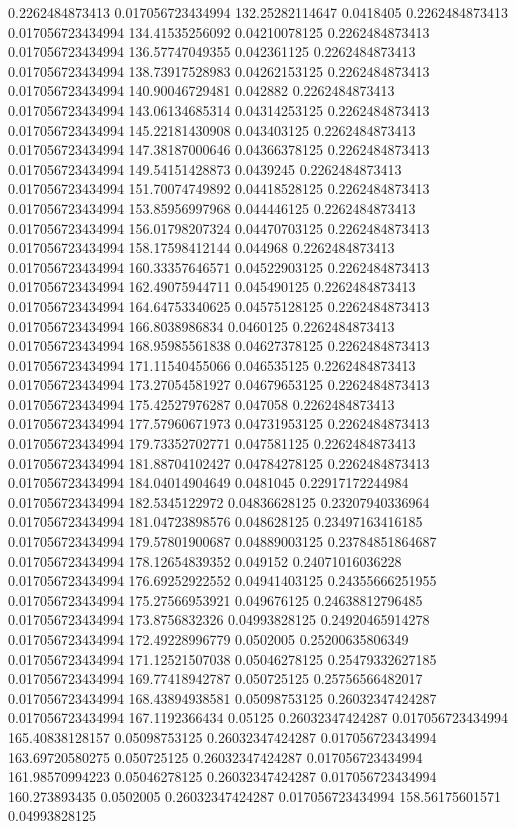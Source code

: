 0.2262484873413 0.017056723434994 132.25282114647 0.0418405
0.2262484873413 0.017056723434994 134.41535256092 0.04210078125
0.2262484873413 0.017056723434994 136.57747049355 0.042361125
0.2262484873413 0.017056723434994 138.73917528983 0.04262153125
0.2262484873413 0.017056723434994 140.90046729481 0.042882
0.2262484873413 0.017056723434994 143.06134685314 0.04314253125
0.2262484873413 0.017056723434994 145.22181430908 0.043403125
0.2262484873413 0.017056723434994 147.38187000646 0.04366378125
0.2262484873413 0.017056723434994 149.54151428873 0.0439245
0.2262484873413 0.017056723434994 151.70074749892 0.04418528125
0.2262484873413 0.017056723434994 153.85956997968 0.044446125
0.2262484873413 0.017056723434994 156.01798207324 0.04470703125
0.2262484873413 0.017056723434994 158.17598412144 0.044968
0.2262484873413 0.017056723434994 160.33357646571 0.04522903125
0.2262484873413 0.017056723434994 162.49075944711 0.045490125
0.2262484873413 0.017056723434994 164.64753340625 0.04575128125
0.2262484873413 0.017056723434994 166.8038986834 0.0460125
0.2262484873413 0.017056723434994 168.95985561838 0.04627378125
0.2262484873413 0.017056723434994 171.11540455066 0.046535125
0.2262484873413 0.017056723434994 173.27054581927 0.04679653125
0.2262484873413 0.017056723434994 175.42527976287 0.047058
0.2262484873413 0.017056723434994 177.57960671973 0.04731953125
0.2262484873413 0.017056723434994 179.73352702771 0.047581125
0.2262484873413 0.017056723434994 181.88704102427 0.04784278125
0.2262484873413 0.017056723434994 184.04014904649 0.0481045
0.22917172244984 0.017056723434994 182.5345122972 0.04836628125
0.23207940336964 0.017056723434994 181.04723898576 0.048628125
0.23497163416185 0.017056723434994 179.57801900687 0.04889003125
0.23784851864687 0.017056723434994 178.12654839352 0.049152
0.24071016036228 0.017056723434994 176.69252922552 0.04941403125
0.24355666251955 0.017056723434994 175.27566953921 0.049676125
0.24638812796485 0.017056723434994 173.8756832326 0.04993828125
0.24920465914278 0.017056723434994 172.49228996779 0.0502005
0.25200635806349 0.017056723434994 171.12521507038 0.05046278125
0.25479332627185 0.017056723434994 169.77418942787 0.050725125
0.25756566482017 0.017056723434994 168.43894938581 0.05098753125
0.26032347424287 0.017056723434994 167.1192366434 0.05125
0.26032347424287 0.017056723434994 165.40838128157 0.05098753125
0.26032347424287 0.017056723434994 163.69720580275 0.050725125
0.26032347424287 0.017056723434994 161.98570994223 0.05046278125
0.26032347424287 0.017056723434994 160.273893435 0.0502005
0.26032347424287 0.017056723434994 158.56175601571 0.04993828125
